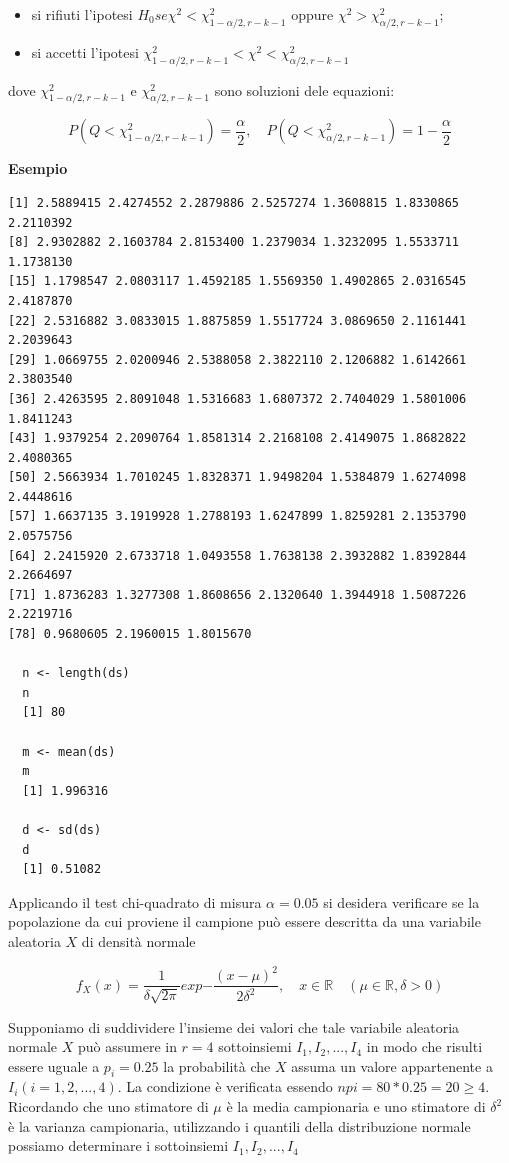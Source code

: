 \begin{itemize}
    \item si rifiuti l'ipotesi $H_0 se \chi^2 < \chi_{1-\alpha/2,r-k-1}^2$ oppure $\chi^2 > \chi_{\alpha/2, r-k-1}^2$;
    \item si accetti l'ipotesi $\chi_{1-\alpha/2,r-k-1}^2 < \chi^2 < \chi_{\alpha/2, r-k-1}^2$
\end{itemize}

dove $\chi_{1-\alpha/2,r-k-1}^2$ e $\chi_{\alpha/2,r-k-1}^2$ sono soluzioni dele equazioni:

\[P(Q<\chi_{1-\alpha/2,r-k-1}^2) = \frac{\alpha}{2}, \quad P(Q<\chi_{\alpha/2,r-k-1}^2) = 1-\frac{\alpha}{2}\]

\noindent \textbf{Esempio}

\begin{lstlisting}
[1] 2.5889415 2.4274552 2.2879886 2.5257274 1.3608815 1.8330865 2.2110392
[8] 2.9302882 2.1603784 2.8153400 1.2379034 1.3232095 1.5533711 1.1738130
[15] 1.1798547 2.0803117 1.4592185 1.5569350 1.4902865 2.0316545 2.4187870
[22] 2.5316882 3.0833015 1.8875859 1.5517724 3.0869650 2.1161441 2.2039643
[29] 1.0669755 2.0200946 2.5388058 2.3822110 2.1206882 1.6142661 2.3803540
[36] 2.4263595 2.8091048 1.5316683 1.6807372 2.7404029 1.5801006 1.8411243
[43] 1.9379254 2.2090764 1.8581314 2.2168108 2.4149075 1.8682822 2.4080365
[50] 2.5663934 1.7010245 1.8328371 1.9498204 1.5384879 1.6274098 2.4448616
[57] 1.6637135 3.1919928 1.2788193 1.6247899 1.8259281 2.1353790 2.0575756
[64] 2.2415920 2.6733718 1.0493558 1.7638138 2.3932882 1.8392844 2.2664697
[71] 1.8736283 1.3277308 1.8608656 2.1320640 1.3944918 1.5087226 2.2219716
[78] 0.9680605 2.1960015 1.8015670

  n <- length(ds)
  n
  [1] 80

  m <- mean(ds)
  m
  [1] 1.996316

  d <- sd(ds)
  d
  [1] 0.51082
\end{lstlisting}

Applicando il test chi-quadrato di misura $\alpha = 0.05$ si desidera verificare se la popolazione da cui proviene il campione può essere descritta da una variabile aleatoria $X$ di densità normale

\[f_X(x) = \frac{1}{\delta \sqrt{2\pi}}exp{-\frac{(x-\mu)^2}{2\delta^2}}, \quad x \in \mathbb{R} \quad (\mu \in \mathbb{R}, \delta>0)\]

Supponiamo di suddividere l'insieme dei valori che tale variabile aleatoria normale $X$ può assumere in $r=4$ sottoinsiemi $I_1, I_2, ..., I_4$ in modo che risulti essere uguale a $p_i=0.25$ la probabilità che $X$ assuma un valore appartenente a $I_i(i=1,2,...,4)$. La condizione è verificata essendo $npi = 80*0.25 = 20\geq4$. Ricordando che uno stimatore di $\mu$ è la media campionaria e uno stimatore di $\delta^2$ è la varianza campionaria, utilizzando i quantili della distribuzione normale possiamo determinare i sottoinsiemi $I_1, I_2, ..., I_4$

